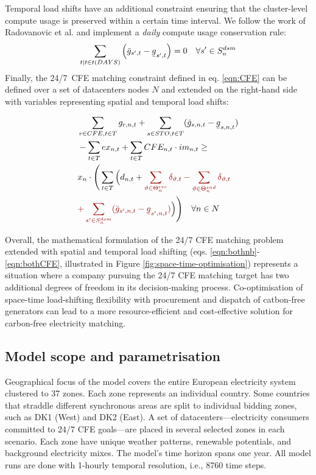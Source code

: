 Temporal load shifts have an additional constraint ensuring that the cluster-level compute usage is preserved within a certain time interval. We follow the work of Radovanovic et al. \cite{radovanovicIEEE2023} and implement a \textit{daily} compute usage conservation rule:
\begin{equation}
    \sum_{t | t \in t(DAYS)} \left(\bar{g}_{s',t} - \ubar{g}_{s',t}\right) = 0 \quad \forall {s'} \in S_n^{dsm}
    \label{eqn:dailyconserv2}
\end{equation}
Finally, the 24/7~CFE matching constraint defined in eq. \ref{eqn:CFE} can be defined over a set of datacenters nodes $N$ and extended on the right-hand side with variables representing spatial and temporal load shifts:

\begin{align}
    &\sum_{r\in CFE, t\in T} g_{r,n,t} + \sum_{s\in STO, t\in T} (\bar{g}_{s,n,t} - \ubar{g}_{s,n,t}) \nonumber \\
    &- \sum_{t\in T} ex_{n,t} + \sum_{t\in T} CFE_{n,t} \cdot im_{n,t} \geq \nonumber \\
    &x_n \cdot
        \Bigg( \sum_{t\in T} \Big( d_{n,t} + \textcolor{darkred}{\sum_{\vartheta \in \Theta_n^{rec}}\delta_{\vartheta, t} - \sum_{\vartheta \in \Theta_n^{snd}}\delta_{\vartheta, t}} \nonumber \\
        & \textcolor{darkred}{+ \sum_{{s'} \in S_n^{dsm}} (\bar{g}_{s',n,t} - \ubar{g}_{s',n,t})}\Big)\Bigg) \quad \forall n \in N\label{eqn:bothCFE}
\end{align}

Overall, the mathematical formulation of the 24/7 CFE matching problem extended with spatial and temporal load shifting (eqs. \ref{eqn:bothnb}-\ref{eqn:bothCFE}, illustrated in Figure \ref{fig:space-time-optimisation}) represents a situation where a company pursuing the 24/7 CFE matching target has two additional degrees of freedom in its decision-making process. Co-optimisation of space-time load-shifting flexibility with procurement and dispatch of catbon-free generators can lead to a more resource-efficient and cost-effective solution for carbon-free electricity matching.

\subsection{Model scope and parametrisation}

Geographical focus of the model covers the entire European electricity system clustered to 37 zones. Each zone represents an individual country. Some countries that straddle different synchronous areas are split to individual bidding zones, such as DK1 (West) and DK2 (East). A set of datacenters---electricity consumers committed to 24/7 CFE goals---are placed in several selected zones in each scenario. Each zone have unique weather patterns, renewable potentials, and background electricity mixes. The model's time horizon spans one year. All model runs are done with 1-hourly temporal resolution, i.e., 8760 time steps.


